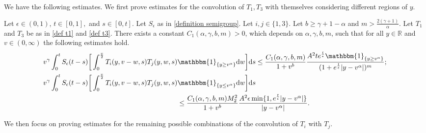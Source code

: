 \documentclass[11pt]{article}
\numberwithin{equation}{section}
\newcommand{\der}{\textup{d}}
\begin{document}
We have the following estimates. We first prove estimates for the convolution of $T_{1}, T_{3}$ with themselves considering different regions of $y$.
\begin{prop}\label{prop estimates t1 t1} Let $\epsilon\in(0,1)$, $t\in[0,1],$ and $s\in[0,t]$. Let $S_{\epsilon}$ as in \eqref{definition semigroup}. Let $i,j\in\{1,3\}$.  Let $b\geq \gamma+1-\alpha$ and $m>\frac{2(\gamma+1)}{\alpha}$. Let $T_{1}$ and $T_{3}$ be as in \eqref{def t1} and \eqref{def t3}. There exists a constant $C_{1}(\alpha,\gamma,b,m)>0$, which depends on $\alpha,\gamma,b,m$, such that for all $y\in\mathbb{R}$ and $v\in(0,\infty)$ the following estimates hold. 
    \begin{align}
      v^{\gamma}\int_{0}^{t}S_{\epsilon}(t-s)\bigg[\int_{0}^{\frac{v}{2}} T_{i}(y,v-w,s)T_{j}(y,w,s) & \mathbbm{1}_{\{y\geq v^{\alpha}\}}\der w\bigg]\der s\leq  \frac{C_{1}(\alpha,\gamma,b,m)}{1+v^{b}} \frac{A^{2} t e^{\frac{t}{\epsilon}}\mathbbm{1}_{\{y\geq v^{\alpha}\}}}{(1+e^{\frac{t}{\epsilon}}|y-v^{\alpha}|)^{m}}  ;\label{estimate for t1 t1 y greater v alpha}\\
       v^{\gamma}\int_{0}^{t}S_{\epsilon}(t-s) \bigg[\int_{0}^{\frac{v}{2}} T_{i}(y,v-w,s)T_{j}(y,w,s) &\mathbbm{1}_{\{y\leq v^{\alpha}\}}\der w\bigg]\der s\nonumber\\
       & \leq \frac{  C_{1}(\alpha,\gamma,b,m)M_{2}^{2}}{1+v^{b}}\frac{A^{2}\epsilon \min\{1,e^{\frac{t}{\epsilon}}|y-v^{\alpha}|\}}{|y-v^{\alpha}|}\label{estimate for t1 t1 y negative}.
     \end{align}
\end{prop}
We then focus on proving estimates for the remaining possible combinations of the convolution of $T_{i}$ with $T_{j}$.
\end{document}
